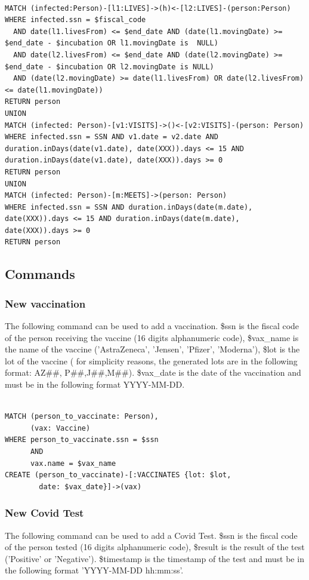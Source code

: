 \documentclass{article}
\begin{document}
\begin{lstlisting}[language=cypher, label=lst:cypher-example]

MATCH (infected:Person)-[l1:LIVES]->(h)<-[l2:LIVES]-(person:Person)
WHERE infected.ssn = $fiscal_code
  AND date(l1.livesFrom) <= $end_date AND (date(l1.movingDate) >= $end_date - $incubation OR l1.movingDate is  NULL)
  AND date(l2.livesFrom) <= $end_date AND (date(l2.movingDate) >= $end_date - $incubation OR l2.movingDate is NULL)
  AND (date(l2.movingDate) >= date(l1.livesFrom) OR date(l2.livesFrom) <= date(l1.movingDate))
RETURN person
UNION
MATCH (infected: Person)-[v1:VISITS]->()<-[v2:VISITS]-(person: Person)
WHERE infected.ssn = SSN AND v1.date = v2.date AND duration.inDays(date(v1.date), date(XXX)).days <= 15 AND duration.inDays(date(v1.date), date(XXX)).days >= 0
RETURN person
UNION
MATCH (infected: Person)-[m:MEETS]->(person: Person)
WHERE infected.ssn = SSN AND duration.inDays(date(m.date), date(XXX)).days <= 15 AND duration.inDays(date(m.date), date(XXX)).days >= 0
RETURN person
\end{lstlisting}

\subsection{Commands}
\subsubsection{New vaccination}
The following command can be used to add a vaccination. \$ssn is the fiscal code of the person receiving the vaccine (16 digits alphanumeric code), \$vax\_name is the name of the vaccine ('AstraZeneca', 'Jensen', 'Pfizer', 'Moderna'), \$lot is the lot of the vaccine (
for simplicity reasons, the generated lots are in the following format: AZ\#\#, P\#\#,J\#\#,M\#\#). \$vax\_date is the date of the vaccination and must be in the following format YYYY-MM-DD.

\begin{lstlisting}[language=cypher, label=lst:cypher-example]

MATCH (person_to_vaccinate: Person),
      (vax: Vaccine)
WHERE person_to_vaccinate.ssn = $ssn
      AND
      vax.name = $vax_name
CREATE (person_to_vaccinate)-[:VACCINATES {lot: $lot,
        date: $vax_date}]->(vax)

\end{lstlisting}
\subsubsection{New Covid Test}
The following command can be used to add a Covid Test. \$ssn is the fiscal code of the person tested (16 digits alphanumeric code), \$result is the result of the test ('Positive' or 'Negative'). \$timestamp is the timestamp of the test and must be in the following format 'YYYY-MM-DD hh:mm:ss'.
\end{document}
